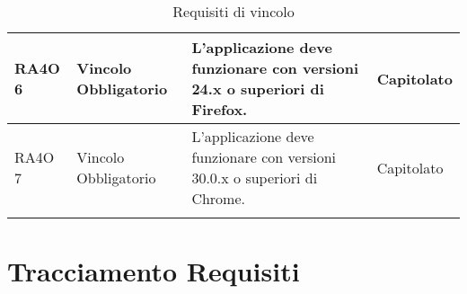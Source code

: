 \begin{center}
\begin{longtable}{ | l | p{2cm} | p{5cm} | p{1.7cm} |}
        RA4O 6 & Vincolo \newline  Obbligatorio  & L’applicazione deve funzionare con versioni 24.x o superiori di Firefox. &  Capitolato \newline  \\ \hline      
        RA4O 7 & Vincolo \newline  Obbligatorio  & L’applicazione deve funzionare con versioni 30.0.x o superiori di Chrome. &  Capitolato \newline  \\ \hline
      \caption{Requisiti di vincolo}
      \end{longtable}
      \egroup
      \end{center}  
\clearpage
\section{Tracciamento Requisiti}
